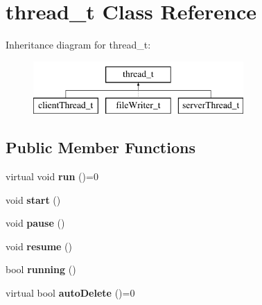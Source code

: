 \hypertarget{classthread__t}{\section{thread\-\_\-t \-Class \-Reference}
\label{classthread__t}
}
\-Inheritance diagram for thread\-\_\-t\-:\begin{figure}[H]
\begin{center}
\leavevmode
\includegraphics[height=2.000000cm]{classthread__t}
\end{center}
\end{figure}
\subsection*{\-Public \-Member \-Functions}
\begin{DoxyCompactItemize}
\item 
\hypertarget{classthread__t_a47017836d3e655307adae609287ea03d}{virtual void {\bfseries run} ()=0}\label{classthread__t_a47017836d3e655307adae609287ea03d}

\item 
\hypertarget{classthread__t_a410075dfb7ffa2f2f0cdaa03810b3c6c}{void {\bfseries start} ()}\label{classthread__t_a410075dfb7ffa2f2f0cdaa03810b3c6c}

\item 
\hypertarget{classthread__t_a7708cd2f2845eff3e017c6b4cf060aa0}{void {\bfseries pause} ()}\label{classthread__t_a7708cd2f2845eff3e017c6b4cf060aa0}

\item 
\hypertarget{classthread__t_a1a893684a06eae44895a683c6d147a7d}{void {\bfseries resume} ()}\label{classthread__t_a1a893684a06eae44895a683c6d147a7d}

\item 
\hypertarget{classthread__t_a71564db43b1fdef23e3d70af60101df8}{bool {\bfseries running} ()}\label{classthread__t_a71564db43b1fdef23e3d70af60101df8}

\item 
\hypertarget{classthread__t_ade5a567f3ac3a001e6af5237554877be}{virtual bool {\bfseries auto\-Delete} ()=0}\label{classthread__t_ade5a567f3ac3a001e6af5237554877be}

\end{DoxyCompactItemize}
